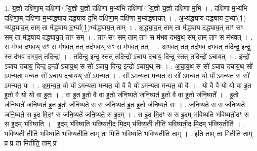 \documentclass[17pt]{extarticle}
\begin{document}
1. य॒ज्ञो दक्षि॑णा॒म् दक्षि॑णां ॅय॒ज्ञो य॒ज्ञो दक्षि॑णा म॒भ्य॑भि दक्षि॑णां ॅय॒ज्ञो य॒ज्ञो दक्षि॑णा म॒भि । . दक्षि॑णा म॒भ्य॑भि दक्षि॑णा॒म् दक्षि॑णा म॒भ्य॑द्ध्याय दद्ध्याय द॒भि दक्षि॑णा॒म् दक्षि॑णा म॒भ्य॑द्ध्यायत् । . अ॒भ्य॑द्ध्याय दद्ध्याय द॒भ्या᳚(1॒) भ्य॑द्ध्याय॒त् ताम् ता म॑द्ध्याय द॒भ्या᳚(1॒)भ्य॑द्ध्याय॒त् ताम् । . अ॒द्ध्या॒य॒त् ताम् ता म॑द्ध्याय दद्ध्याय॒त् ताꣳ सꣳ सम् ता म॑द्ध्याय दद्ध्याय॒त् ताꣳ सम् । . ताꣳ सꣳ सम् ताम् ताꣳ स म॑भव दभव॒थ् सम् ताम् ताꣳ स म॑भवत् । . स म॑भव दभव॒थ् सꣳ स म॑भव॒त् तत् तद॑भव॒थ् सꣳ स म॑भव॒त् तत् । . अ॒भ॒व॒त् तत् तद॑भव दभव॒त् तदिन्द्र॒ इन्द्र॒ स्त द॑भव दभव॒त् तदिन्द्रः॑ । . तदिन्द्र॒ इन्द्र॒ स्तत् तदिन्द्रो॑ ऽचाय दचाय॒ दिन्द्र॒ स्तत् तदिन्द्रो॑ ऽचायत् । . इन्द्रो॑ ऽचाय दचाय॒ दिन्द्र॒ इन्द्रो॑ ऽचाय॒थ् स सो॑ ऽचाय॒ दिन्द्र॒ इन्द्रो॑ ऽचाय॒थ् सः । . अ॒चा॒य॒थ् स सो॑ ऽचाय दचाय॒थ् सो॑ ऽमन्यता मन्यत॒ सो॑ ऽचाय दचाय॒थ् सो॑ ऽमन्यत । . सो॑ ऽमन्यता मन्यत॒ स सो॑ ऽमन्यत॒ यो यो॑ ऽमन्यत॒ स सो॑ ऽमन्यत॒ यः । . अ॒म॒न्य॒त॒ यो यो॑ ऽमन्यता मन्यत॒ यो वै वै यो॑ ऽमन्यता मन्यत॒ यो वै । . यो वै वै यो यो वा इ॒त इ॒तो वै यो यो वा इ॒तः । . वा इ॒त इ॒तो वै वा इ॒तो ज॑नि॒ष्यते॑ जनि॒ष्यत॑ इ॒तो वै वा इ॒तो ज॑नि॒ष्यते᳚ । . इ॒तो ज॑नि॒ष्यते॑ जनि॒ष्यत॑ इ॒त इ॒तो ज॑नि॒ष्यते॒ स स ज॑नि॒ष्यत॑ इ॒त इ॒तो ज॑नि॒ष्यते॒ सः । . ज॒नि॒ष्यते॒ स स ज॑नि॒ष्यते॑ जनि॒ष्यते॒ स इ॒द मि॒दꣳ स ज॑नि॒ष्यते॑ जनि॒ष्यते॒ स इ॒दम् । . स इ॒द मि॒दꣳ स स इ॒दम् भ॑विष्यति भविष्यती॒दꣳ स स इ॒दम् भ॑विष्यति । . इ॒दम् भ॑विष्यति भविष्यती॒द मि॒दम् भ॑विष्य॒ती तीति॑ भविष्यती॒द मि॒दम् भ॑विष्य॒तीति॑ । . भ॒वि॒ष्य॒ती तीति॑ भविष्यति भविष्य॒तीति॒ ताम् ता मिति॑ भविष्यति भविष्य॒तीति॒ ताम् । . इति॒ ताम् ता मितीति॒ ताम् प्र प्र ता मितीति॒ ताम् प्र । \newline
\end{document}
